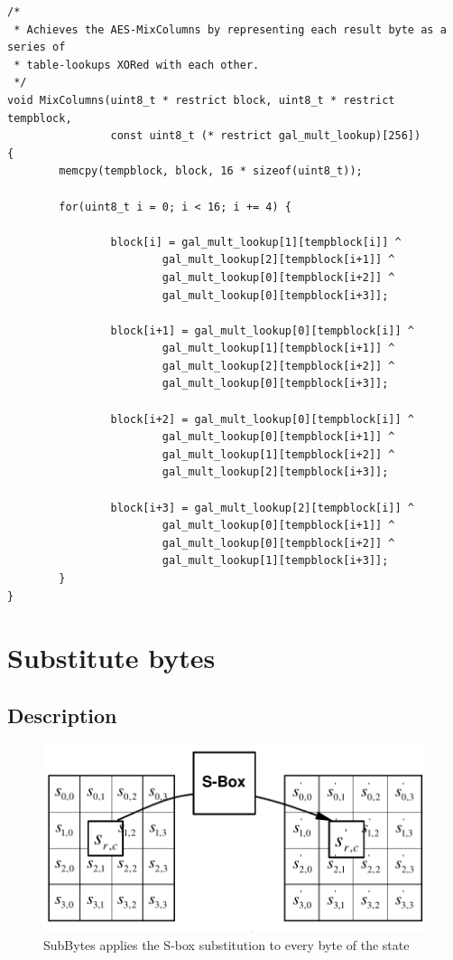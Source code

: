 \begin{lstlisting}
/*
 * Achieves the AES-MixColumns by representing each result byte as a series of
 * table-lookups XORed with each other.
 */
void MixColumns(uint8_t * restrict block, uint8_t * restrict tempblock,
                const uint8_t (* restrict gal_mult_lookup)[256])
{
        memcpy(tempblock, block, 16 * sizeof(uint8_t));

        for(uint8_t i = 0; i < 16; i += 4) {

                block[i] = gal_mult_lookup[1][tempblock[i]] ^
                        gal_mult_lookup[2][tempblock[i+1]] ^
                        gal_mult_lookup[0][tempblock[i+2]] ^
                        gal_mult_lookup[0][tempblock[i+3]];

                block[i+1] = gal_mult_lookup[0][tempblock[i]] ^
                        gal_mult_lookup[1][tempblock[i+1]] ^
                        gal_mult_lookup[2][tempblock[i+2]] ^
                        gal_mult_lookup[0][tempblock[i+3]];

                block[i+2] = gal_mult_lookup[0][tempblock[i]] ^
                        gal_mult_lookup[0][tempblock[i+1]] ^
                        gal_mult_lookup[1][tempblock[i+2]] ^
                        gal_mult_lookup[2][tempblock[i+3]];

                block[i+3] = gal_mult_lookup[2][tempblock[i]] ^
                        gal_mult_lookup[0][tempblock[i+1]] ^
                        gal_mult_lookup[0][tempblock[i+2]] ^
                        gal_mult_lookup[1][tempblock[i+3]];
        }
}
\end{lstlisting}



\hypertarget{substitute-bytes}{%
\section{Substitute bytes}\label{substitute-bytes}}

\hypertarget{description-5}{%
\subsection{Description}\label{description-5}}

\begin{figure}
\centering
\includegraphics[scale = 0.3]{data/figures/subbytes.png}
\caption{SubBytes applies the S-box substitution to every byte of the
state}
\end{figure}

